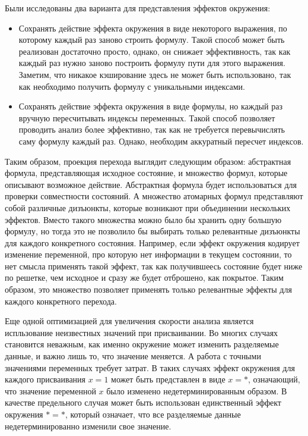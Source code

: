 Были исследованы два варианта для представления эффектов окружения:
\begin{itemize}
\item Сохранять действие эффекта окружения в виде некоторого выражения, по которому каждый раз заново строить формулу.
Такой способ может быть реализован достаточно просто, однако, он снижает эффективность, так как каждый раз нужно заново построить формулу пути для этого выражения. 
Заметим, что никакое кэширование здесь не может быть использовано, так как необходимо получить формулу с уникальными индексами.
\item Сохранять действие эффекта окружения в виде формулы, но каждый раз вручную пересчитывать индексы переменных.
Такой способ позволяет проводить анализ более эффективно, так как не требуется перевычислять саму формулу каждый раз.
Однако, необходим аккуратный пересчет индексов. 
\end{itemize}

Таким образом, проекция перехода выглядит следующим образом: абстрактная формула, представляющая исходное состояние, и множество формул, которые описывают возможное действие.
Абстрактная формула будет использоваться для проверки совместности состояний. 
А множество атомарных формул представляют собой различные дизъюнкты, которые возникают при объединении нескольких эффектов.
Вместо такого множества можно было бы хранить одну большую формулу, но тогда это не позволило бы выбирать только релевантные дизъюнкты для каждого конкретного состояния.
Например, если эффект окружения кодирует изменение переменной, про которую нет информации в текущем состоянии, то нет смысла применять такой эффект, так как получившеесь состояние будет ниже по решетке, чем исходное и сразу же будет отброшено, как покрытое.
Таким образом, это множество позволяет применять только релевантные эффекты для каждого конкретного перехода.

Еще одной оптимизацией для увеличения скорости анализа является испльзование неизвестных значений при присваивании.
Во многих случаях становится неважным, как именно окружение может изменить разделяемые данные, и важно лишь то, что значение меняется.
А работа с точными значениями переменных требует затрат.
В таких случаях эффект окружения для каждого присваивания $x = 1$ может быть представлен в виде $x = *$, означающий, что значение переменной $x$ было изменено недетерминированным образом.
В качестве предельного случая может быть использован единственный эффект окружения $* = *$, который означает, что все разделяемые данные недетерминированно изменили свое значение.

